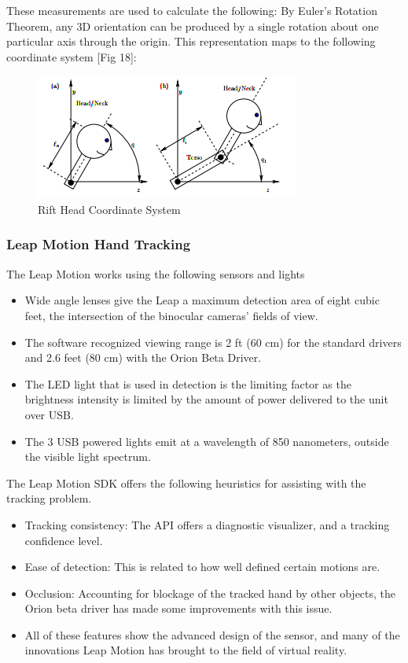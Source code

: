 \documentclass[a4paper,10pt]{article}
\begin{document}
These measurements are used to calculate the following:
By Euler’s Rotation Theorem, any 3D orientation can
be produced by a single rotation about one particular axis
through the origin. This representation maps to the following coordinate system [Fig 18]:
\begin{figure}[H]
	\centerline{\includegraphics[scale=0.7]{riftHead.png}}
	\caption{Rift Head Coordinate System}
	\label{fig:magnets2}
	\end{figure}
\pagebreak
\subsubsection{Leap Motion Hand Tracking}
The Leap Motion works using the following sensors and lights \cite{leapProc}
\begin{itemize}
\item Wide angle lenses give the Leap a maximum detection area of eight cubic feet, the intersection of the binocular cameras’ fields of view. 
\item The software recognized viewing range is 2 ft (60 cm) for the standard drivers and 2.6 feet (80 cm) with the Orion Beta Driver. 
\item The LED light that is used in detection is the limiting factor as the brightness intensity is limited by the amount of power delivered to the unit
over USB.
\item The 3 USB powered lights emit at a wavelength of 850 nanometers, outside the visible light spectrum.
\end{itemize}

The Leap Motion SDK offers the following heuristics for assisting with the tracking problem.\cite{leapHeuristics}
\begin{itemize}
\item Tracking consistency:  The API offers a diagnostic visualizer, and a tracking confidence level.
\item Ease of detection: This is related to how well defined certain motions are. 
\item Occlusion: Accounting for blockage of the tracked hand by other objects, the Orion beta driver has made some improvements with this issue.
\item All of these features show the advanced design of the sensor, and many of the innovations Leap Motion has brought to the field of virtual reality. 
\end{itemize}
\end{document}
